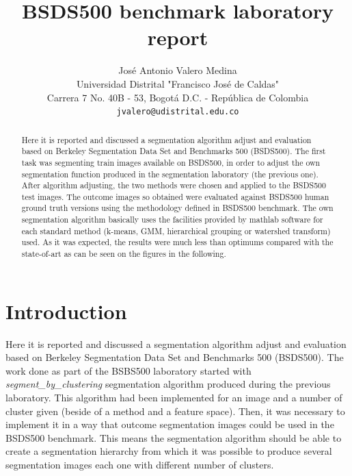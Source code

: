 \documentclass[10pt,twocolumn,letterpaper]{article}
\begin{document}
\title{BSDS500 benchmark laboratory report}

\author{José Antonio Valero Medina\\
Universidad Distrital "Francisco José de Caldas"\\
Carrera 7 No. 40B - 53, Bogotá D.C. - República de Colombia\\
{\tt\small jvalero@udistrital.edu.co}
}

\maketitle

\begin{abstract}
   Here it is reported and discussed a segmentation algorithm adjust and evaluation based on Berkeley Segmentation Data Set and Benchmarks 500 (BSDS500). The first task was segmenting train images available on BSDS500, in order to adjust the own segmentation function produced in the segmentation laboratory (the previous one). After algorithm adjusting, the two methods were chosen and applied to the BSDS500 test images. The outcome images so obtained were evaluated against BSDS500 human ground truth versions using
   the methodology defined in BSDS500 benchmark. The own segmentation algorithm basically uses the facilities
   provided by mathlab software for each standard method (k-means, GMM, hierarchical grouping or watershed
   transform) used. As it was expected, the results were much less than optimums compared with the state-of-art
   as can be seen on the figures in the following.
\end{abstract}

\section{Introduction}

Here it is reported and discussed a segmentation algorithm adjust and evaluation based on Berkeley Segmentation
Data Set and Benchmarks 500 (BSDS500). The work done as part of the BSBS500 laboratory started with \textit{segment\_by\_clustering} segmentation algorithm produced during the previous laboratory. This algorithm had been implemented for an image and a number of cluster given (beside of a method and a feature space). Then, it was necessary to implement it in a way that outcome segmentation images could be used in the BSDS500 benchmark. This means the segmentation algorithm should be able to create a segmentation hierarchy from which it was possible to produce several segmentation images each one with different number of clusters.
\end{document}
